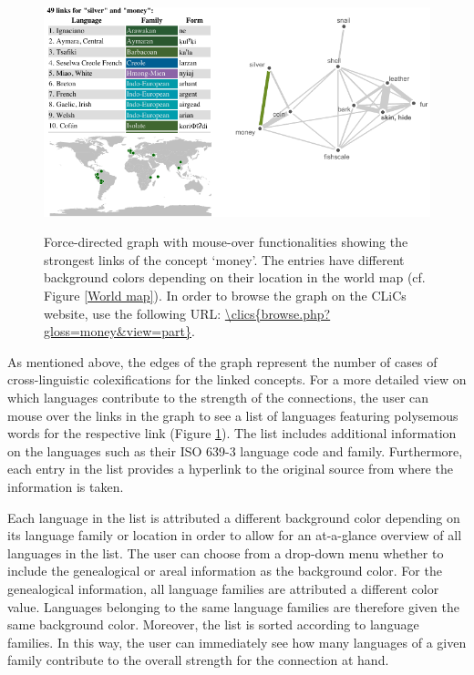 \begin{figure}[htbp]
\begin{center}
    \href{\clics{browse.php?gloss=money&view=part}}{\includegraphics[width=\textwidth]{img/silver-image.pdf}}
\caption{Force-directed graph with mouse-over functionalities showing the strongest links of the
concept `{money}'. The entries have different background colors depending on their location in the
world map (cf. Figure \ref{World map}). In order to browse the graph on the CLiCs website, use the
following URL: \url{\clics{browse.php?gloss=money&view=part}}.}
\label{MoneySilver}
\end{center}
\end{figure}




As mentioned above, the edges of the graph represent the number of cases of cross-linguistic colexifications for the linked concepts. For a more detailed view on which languages contribute to the strength of the connections, the user can mouse over the links in the graph to see a list of  languages featuring polysemous words for the respective link (Figure \ref{MoneySilver}). The list includes additional information on the languages such as their ISO 639-3 language code and family. Furthermore, each entry in the list provides a hyperlink to the original source from where the information is taken.  


Each language in the list is attributed a different background color depending on its language family or location in order to allow for an at-a-glance overview of all languages in the list. The user can choose from a drop-down menu whether to include the genealogical or areal information as the background color. For the genealogical information, all language families are attributed a different color value. Languages belonging to the same language families are therefore given the same background color. Moreover, the list is sorted according to language families. In this way, the user can immediately see how many languages of  a given family contribute to the overall strength for the connection at hand. 

